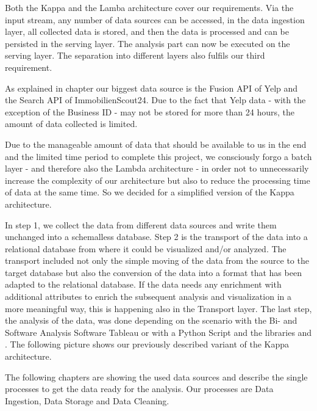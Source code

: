 Both the Kappa and the Lamba architecture cover our requirements.
Via the input stream, any number of data sources can be accessed, in the
data ingestion layer, all collected data is stored, and then the data is processed and can be persisted in the serving layer.
The analysis part can now be executed on the serving layer.
The separation into different layers also fulfils our third requirement.

As explained in chapter  our biggest data source is the Fusion \ac{API} of Yelp and
the Search \ac{API} of ImmobilienScout24.
Due to the fact that Yelp data - with the exception of the Business ID - may not be stored for more than 24 hours,\cite{YelpFaq}
the amount of data collected is limited.

Due to the manageable amount of data that should be available to us in the end and the limited time period to complete this project,
we consciously forgo a batch layer - and therefore also the Lambda architecture -
in order not to unnecessarily increase the complexity of our architecture but also to reduce the processing time of data at the same time.
So we decided for a simplified version of the Kappa architecture.

In step 1, we collect the data from different data sources and write them unchanged into a schemalless database.
Step 2 is the transport of the data into a relational database from where it could be visualized and/or analyzed.
The transport included not only the simple moving of the data from the source to the target database but also the conversion of the data
into a format that has been adapted to the relational database.
If the data needs any enrichment with additional attributes to enrich the subsequent analysis and visualization in a more meaningful way, this is happening also in the Transport layer.
The last step, the analysis of the data, was done depending on the scenario with the Bi- and Software Analysis Software Tableau or with a Python Script and the libraries  and .
The following picture shows our previously described variant of the Kappa architecture.

The following chapters are showing the used data sources and describe the single processes to get the data ready for the analysis.
Our processes are Data Ingestion, Data Storage and Data Cleaning.
